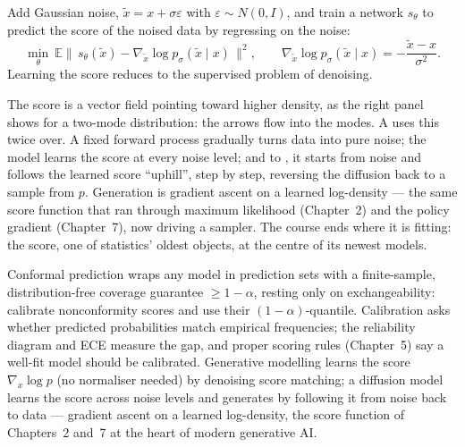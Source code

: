 \documentclass[11pt]{article}
\begin{document}
\begin{definition}
Add Gaussian noise, $\tilde x = x + \sigma\varepsilon$ with
$\varepsilon\sim N(0,I)$, and train a network $s_\theta$ to predict the score of
the noised data by regressing on the noise:
\[
  \min_\theta\ \mathbb{E}\big\|\,s_\theta(\tilde x) - \nabla_{\tilde x}\log p_\sigma(\tilde x\mid x)\,\big\|^2,
  \qquad \nabla_{\tilde x}\log p_\sigma(\tilde x\mid x) = -\frac{\tilde x - x}{\sigma^2}.
\]
Learning the score reduces to the supervised problem of denoising.
\end{definition}

The score is a vector field pointing toward higher density, as the right panel
shows for a two-mode distribution: the arrows flow into the modes. A
 uses this twice over. A fixed forward process gradually
turns data into pure noise; the model learns the score at every noise level; and
to , it starts from noise and follows the learned score
``uphill'', step by step, reversing the diffusion back to a sample from $p$.
Generation is gradient ascent on a learned log-density --- the same score function
that ran through maximum likelihood (Chapter~2) and the policy gradient
(Chapter~7), now driving a sampler. The course ends where it is fitting: the
score, one of statistics' oldest objects, at the centre of its newest models.

\begin{summarybox}
Conformal prediction wraps any model in prediction sets with a finite-sample,
distribution-free coverage guarantee $\ge 1-\alpha$, resting only on
exchangeability: calibrate nonconformity scores and use their
$(1-\alpha)$-quantile. Calibration asks whether predicted probabilities match
empirical frequencies; the reliability diagram and ECE measure the gap, and
proper scoring rules (Chapter~5) say a well-fit model should be calibrated.
Generative modelling learns the score $\nabla_x\log p$ (no normaliser needed) by
denoising score matching; a diffusion model learns the score across noise levels
and generates by following it from noise back to data --- gradient ascent on a
learned log-density, the score function of Chapters~2 and~7 at the heart of modern
generative AI.
\end{summarybox}
\end{document}
